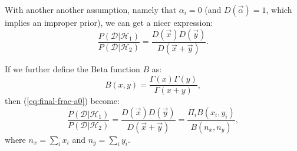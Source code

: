 \documentclass{article}
\let\product\Pi
\begin{document}
With another another assumption, namely that $\alpha_i = 0$ (and $D(\vec\alpha)
= 1$, which implies an improper prior), we can get a nicer expression:
\begin{equation}
\frac{P(\mathcal{D}|\mathcal{H}_1)}{P(\mathcal{D}|\mathcal{H}_2)} = \frac{D(\vec{x})D(\vec{y})}{D(\vec{x}+\vec{y})}.
\label{eq:final-frac-a0}
\end{equation}

If we further define the Beta function $B$ as:
\begin{equation}
B(x,y) = \frac{\Gamma(x)\Gamma(y)}{\Gamma(x+y)},
\end{equation}
then (\ref{eq:final-frac-a0}) become:
\begin{equation}
\frac{P(\mathcal{D}|\mathcal{H}_1)}{P(\mathcal{D}|\mathcal{H}_2)} =
        \frac{D(\vec{x})D(\vec{y})}{D(\vec{x}+\vec{y})} =
        \frac{\product_i B(x_i, y_i)}{B(n_x,n_y)},
\end{equation}
where $n_x = \sum_i x_i$ and $n_y = \sum_i y_i$.
\end{document}
